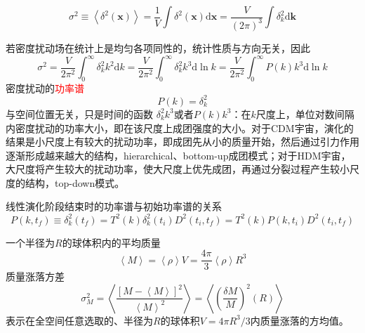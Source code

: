 \documentclass[12pt,a4paper]{article}
\renewcommand{\vec}[1]{\boldsymbol{#1}}
\newcommand{\dif}{\mathrm{d}}
\begin{document}
\begin{equation}
\sigma^2 \equiv \left\langle \delta^2(\vec{x}) \right\rangle = \frac{1}{V} \int \delta^2(\vec{x}) \dif \vec{x} = \frac{V}{(2\pi)^3} \int \delta^2_k \dif \vec{k}
\end{equation}

若密度扰动场在统计上是均匀各项同性的，统计性质与方向无关，因此
\begin{equation}
\sigma^2 = \frac{V}{2\pi^2} \int_0^{\infty} \delta^2_k k^2 \dif k = \frac{V}{2\pi^2} \int_0^{\infty} \delta^2_k k^3 \dif \ln k = \frac{V}{2\pi^2} \int_0^{\infty} P(k) k^3 \dif \ln k
\end{equation}
密度扰动的\textcolor{red}{功率谱}
\begin{equation}
P(k) = \delta^2_k
\end{equation}
与空间位置无关，只是时间的函数
$\delta^2_k k^3$或者$P(k) k^3$：在$k$尺度上，单位对数间隔内密度扰动的功率大小，即在该尺度上成团强度的大小。对于CDM宇宙，演化的结果是小尺度上有较大的扰动功率，即成团先从小的质量开始，然后通过引力作用逐渐形成越来越大的结构，hierarchical、bottom-up成团模式；对于HDM宇宙，大尺度将产生较大的扰动功率，使大尺度上优先成团，再通过分裂过程产生较小尺度的结构，top-down模式。

线性演化阶段结束时的功率谱与初始功率谱的关系
\begin{equation}
P(k, t_f) \equiv \delta^2_k(t_f) = T^2(k) \delta^2_k(t_i) D^2(t_i, t_f) = T^2(k) P(k, t_i) D^2(t_i, t_f)  
\end{equation}

一个半径为$R$的球体积内的平均质量
\begin{equation}
\left\langle M \right\rangle = \left\langle \rho \right\rangle V = \frac{4\pi}{3} \left\langle \rho \right\rangle R^3
\end{equation}
质量涨落方差
\begin{equation}
\sigma_M^2 = \left\langle \frac{[M -\left\langle M \right\rangle]^2}{\left\langle M \right\rangle^2} \right\rangle = \left\langle \left( \frac{\delta M}{M} \right)^2 (R) \right\rangle 
\end{equation}
表示在全空间任意选取的、半径为$R$的球体积$V=4\pi R^3/3$内质量涨落的方均值。
\end{document}
